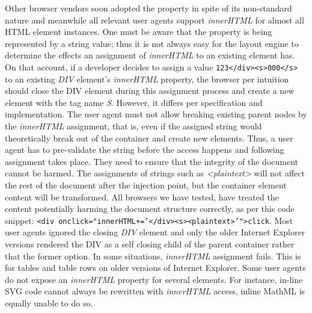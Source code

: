     Other browser vendors soon adopted the property in spite of its non-standard nature and meanwhile all relevant user agents support \textit{innerHTML} for almost all HTML element instances. One must be aware that the property is being represented by a string value; thus it is not always easy for the layout engine to determine the effects an assignment of \textit{innerHTML} to an existing element has. On that account, if a developer decides to assign a value \texttt{123</div><s>000</s>} to an existing \textit{DIV} element's \textit{innerHTML} property, the browser per intuition should close the DIV element during this assignment process and create a new element with the tag name \textit{S}. However, it differs per specification and implementation. The user agent must not allow breaking existing parent nodes by the \textit{innerHTML} assignment, that is, even if the assigned string would theoretically break out of the container and create new elements. Thus, a user agent has to pre-validate the string 
before the access happens and following assignment takes place. They need to ensure that the integrity of the document cannot be harmed. The assignments of strings such as \textit{<plaintext>} will not affect the rest of the document after the injection point, but the container element content will be transformed. All browsers we have tested, have treated the content potentially harming the document structure correctly, as per this code snippet: \texttt{<div onclick="innerHTML+='</div><s><plaintext>'">click}. Most user agents ignored the closing \textit{DIV} element and only the older Internet Explorer versions rendered the DIV as a self closing child of the parent container rather that the former option. In some situations, \textit{innerHTML} assignment fails. This is for tables and table rows on older versions of Internet Explorer. Some user agents do not expose an \textit{innerHTML} property for several elements. For instance, in-line SVG code cannot always be rewritten with \textit{innerHTML} access, 
inline MathML is equally unable to do so.\\

